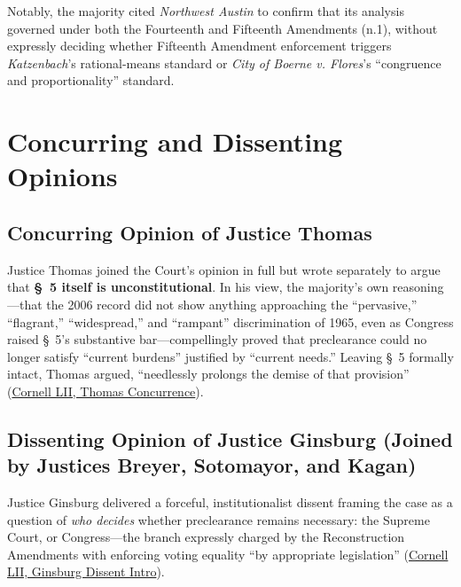 \documentclass[12pt]{article}
\begin{document}
Notably, the majority cited \emph{Northwest Austin} to confirm that its analysis governed under both the Fourteenth and Fifteenth Amendments (n.1), without expressly deciding whether Fifteenth Amendment enforcement triggers \emph{Katzenbach}'s rational-means standard or \emph{City of Boerne v. Flores}'s ``congruence and proportionality'' standard.

\section{Concurring and Dissenting Opinions}

\subsection{Concurring Opinion of Justice Thomas}
Justice Thomas joined the Court's opinion in full but wrote separately to argue that \textbf{\S~5 itself is unconstitutional}. In his view, the majority's own reasoning---that the 2006 record did not show anything approaching the ``pervasive,'' ``flagrant,'' ``widespread,'' and ``rampant'' discrimination of 1965, even as Congress raised \S~5's substantive bar---compellingly proved that preclearance could no longer satisfy ``current burdens'' justified by ``current needs.'' Leaving \S~5 formally intact, Thomas argued, ``needlessly prolongs the demise of that provision'' (\href{https://www.law.cornell.edu/supremecourt/text/12-96}{Cornell LII, Thomas Concurrence}).

\subsection{Dissenting Opinion of Justice Ginsburg (Joined by Justices Breyer, Sotomayor, and Kagan)}
Justice Ginsburg delivered a forceful, institutionalist dissent framing the case as a question of \emph{who decides} whether preclearance remains necessary: the Supreme Court, or Congress---the branch expressly charged by the Reconstruction Amendments with enforcing voting equality ``by appropriate legislation'' (\href{https://www.law.cornell.edu/supremecourt/text/12-96}{Cornell LII, Ginsburg Dissent Intro}).
\end{document}

